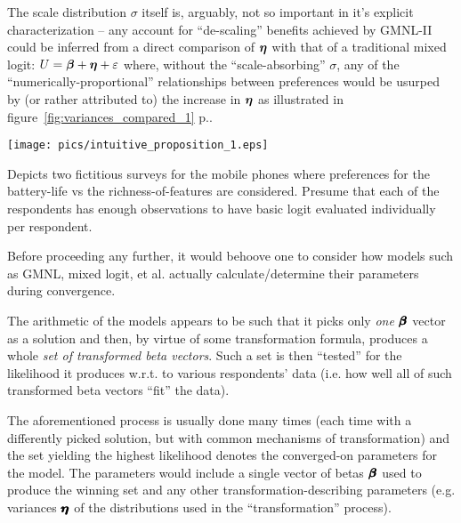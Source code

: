 \documentclass[12pt,a4paper]{article}
\begin{document}
The scale distribution \(\sigma\) itself is, arguably, not so important in it's explicit characterization -- any  account for ``de-scaling'' benefits achieved by GMNL-II could be inferred from a direct comparison of  \(\hm{\eta}\) with that of a traditional mixed logit: \(U=\hm{\beta}+\hm{\eta} + \varepsilon\) where, without the ``scale-absorbing'' \(\sigma\), any of the ``numerically-proportional'' relationships between preferences would be usurped by (or rather attributed to) the increase in \(\hm{\eta}\) as illustrated in figure~\ref{fig:variances_compared_1} p.\pageref{fig:variances_compared_1}.


\begin{sidewaysfigure}
\begin{framed}
\texttt{[image: pics/intuitive\_proposition\_1.eps]}

Depicts two fictitious surveys for the mobile phones where preferences for the battery-life vs the richness-of-features are considered. Presume that each of the respondents has enough observations to have basic logit evaluated individually per respondent.

\caption{Mixed logit vs GMNL-II and relevant (in)ability to separate scale from variance.} 

\label{fig:variances_compared_1}
\end{framed}
\end{sidewaysfigure}

\newpage
Before proceeding any further, it would behoove one to consider how models such as GMNL, mixed logit, et al. actually calculate/determine their parameters during convergence.

The arithmetic of the models appears to be such that it picks only \textit{one} \(\pmb{\hm{\beta}}\) vector as a solution and then, by virtue of some transformation formula, produces a whole \textit{set of transformed beta vectors}. Such a set is then ``tested'' for the likelihood it produces w.r.t. to various respondents' data (i.e. how well all of such transformed beta vectors ``fit'' the data). 

The aforementioned process is usually done many times (each time with a differently picked solution, but with common mechanisms of transformation) and the set yielding the highest likelihood denotes the converged-on parameters for the model. The parameters would include a single vector of betas \(\pmb{\hm{\beta}}\) used to produce the winning set and any other transformation-describing parameters (e.g. variances \(\pmb{\hm{\eta}}\) of the distributions used in the ``transformation'' process).
\end{document}
